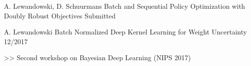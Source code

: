 \begin{cventries}
    \cventry
    {A. Lewandowski, D. Schuurmans}
    {Batch and Sequential Policy Optimization with Doubly Robust Objectives}
    {Submitted}
    {
    }

  \cventry
    {A. Lewandowski}
    {Batch Normalized Deep Kernel Learning for Weight
Uncertainty}
    {12/2017}
    {
      \begin{cvitems}
    	\item[>>] Second workshop on Bayesian Deep Learning (NIPS 2017)
      \end{cvitems}
    }
  \end{cventries}

% 
% 
